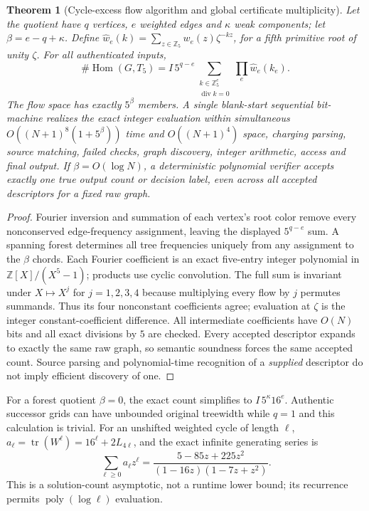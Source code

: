 \documentclass[11pt]{article}
\newtheorem{theorem}{Theorem}
\begin{document}
\begin{theorem}[Cycle-excess flow algorithm and global certificate multiplicity]
Let the quotient have $q$ vertices, $e$ weighted edges and $\kappa$ weak components; let $\beta=e-q+\kappa$. Define $\hat w_e(k)=\sum_{z\in\mathbb Z_5}w_e(z)\zeta^{-kz}$, for a fifth primitive root of unity $\zeta$. For all authenticated inputs,
\[
\boxed{\#\operatorname{Hom}(G,T_5)= I\,5^{q-e}
\sum_{\substack{k\in\mathbb Z_5^e\\\operatorname{div}k=0}}\prod_e\hat w_e(k_e).}
\]
The flow space has exactly $5^\beta$ members. A single blank-start sequential bit-machine realizes the exact integer evaluation within simultaneous $O((N+1)^8(1+5^\beta))$ time and $O((N+1)^4)$ space, charging parsing, source matching, failed checks, graph discovery, integer arithmetic, access and final output. If $\beta=O(\log N)$, a deterministic polynomial verifier accepts exactly one true output count or decision label, even across \emph{all} accepted descriptors for a fixed raw graph.
\end{theorem}
\begin{proof}
Fourier inversion and summation of each vertex's root color remove every nonconserved edge-frequency assignment, leaving the displayed $5^{q-e}$ sum. A spanning forest determines all tree frequencies uniquely from any assignment to the $\beta$ chords. Each Fourier coefficient is an exact five-entry integer polynomial in $\mathbb Z[X]/(X^5-1)$; products use cyclic convolution. The full sum is invariant under $X\mapsto X^j$ for $j=1,2,3,4$ because multiplying every flow by $j$ permutes summands. Thus its four nonconstant coefficients agree; evaluation at $\zeta$ is the integer constant-coefficient difference. All intermediate coefficients have $O(N)$ bits and all exact divisions by $5$ are checked. Every accepted descriptor expands to exactly the same raw graph, so semantic soundness forces the same accepted count. Source parsing and polynomial-time recognition of a \emph{supplied} descriptor do not imply efficient discovery of one.
\end{proof}
For a forest quotient $\beta=0$, the exact count simplifies to $I\,5^\kappa16^e$. Authentic successor grids can have unbounded original treewidth while $q=1$ and this calculation is trivial. For an unshifted weighted cycle of length $\ell$, $a_\ell=\operatorname{tr}(W^\ell)=16^\ell+2L_{4\ell}$, and the exact infinite generating series is
\[
\sum_{\ell\ge0}a_\ell z^\ell
=\frac{5-85z+225z^2}{(1-16z)(1-7z+z^2)}.
\]
This is a solution-count asymptotic, not a runtime lower bound; its recurrence permits $\operatorname{poly}(\log\ell)$ evaluation.
\end{document}
